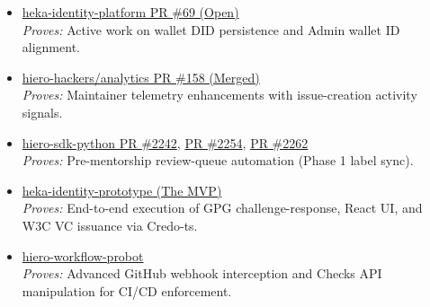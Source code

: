 \documentclass[11pt]{article}
\begin{document}
\begin{itemize}[leftmargin=18pt,itemsep=6pt,topsep=5pt]
    \item \href{https://github.com/hiero-ledger/heka-identity-platform/pull/69}{heka-identity-platform PR \#69 (Open)} \\
    \textit{Proves:} Active work on wallet DID persistence and Admin wallet ID alignment.

    \item \href{https://github.com/hiero-hackers/analytics/pull/158}{hiero-hackers/analytics PR \#158 (Merged)} \\
    \textit{Proves:} Maintainer telemetry enhancements with issue-creation activity signals.

\item 
\href{https://github.com/hiero-ledger/hiero-sdk-python/pull/2242}{hiero-sdk-python PR \#2242}, 
\href{https://github.com/hiero-ledger/hiero-sdk-python/pull/2254}{PR \#2254}, 
\href{https://github.com/hiero-ledger/hiero-sdk-python/pull/2262}{PR \#2262}  \\  
\textit{Proves:} Pre-mentorship review-queue automation (Phase 1 label sync).
    
    \item \href{https://github.com/darshit2308/heka-identity-prototype}{heka-identity-prototype (The MVP)} \\
    \textit{Proves:} End-to-end execution of GPG challenge-response, React UI, and W3C VC issuance via Credo-ts.
    
    \item \href{https://github.com/darshit2308/hiero-workflow-probot}{hiero-workflow-probot} \\
    \textit{Proves:} Advanced GitHub webhook interception and Checks API manipulation for CI/CD enforcement.
\end{itemize}
\end{document}
